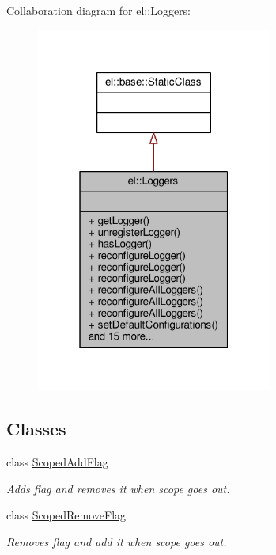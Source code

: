 Collaboration diagram for el\+:\+:Loggers\+:
\nopagebreak
\begin{figure}[H]
\begin{center}
\leavevmode
\includegraphics[width=220pt]{dc/dc4/classel_1_1Loggers__coll__graph}
\end{center}
\end{figure}
\subsection*{Classes}
\begin{DoxyCompactItemize}
\item 
class \hyperlink{classel_1_1Loggers_1_1ScopedAddFlag}{Scoped\+Add\+Flag}
\begin{DoxyCompactList}\small\item\em Adds flag and removes it when scope goes out. \end{DoxyCompactList}\item 
class \hyperlink{classel_1_1Loggers_1_1ScopedRemoveFlag}{Scoped\+Remove\+Flag}
\begin{DoxyCompactList}\small\item\em Removes flag and add it when scope goes out. \end{DoxyCompactList}\end{DoxyCompactItemize}
